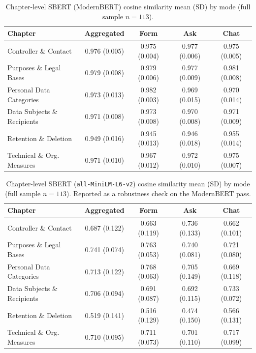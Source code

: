 \begin{table}[H]
\centering
\small
\setlength{\tabcolsep}{4pt}
\begin{tabular}{@{}l c c c c@{}}
\toprule
Chapter & Aggregated & Form & Ask & Chat \\
\midrule
Controller \& Contact         & 0.976 (0.005) & 0.975 (0.004) & 0.977 (0.006) & 0.975 (0.005) \\
Purposes \& Legal Bases       & 0.979 (0.008) & 0.979 (0.006) & 0.977 (0.009) & 0.981 (0.008) \\
Personal Data Categories      & 0.973 (0.013) & 0.982 (0.003) & 0.969 (0.015) & 0.970 (0.014) \\
Data Subjects \& Recipients   & 0.971 (0.008) & 0.973 (0.008) & 0.970 (0.008) & 0.971 (0.009) \\
Retention \& Deletion         & 0.949 (0.016) & 0.945 (0.013) & 0.946 (0.018) & 0.955 (0.014) \\
Technical \& Org. Measures    & 0.971 (0.010) & 0.967 (0.012) & 0.972 (0.010) & 0.975 (0.007) \\
\bottomrule
\end{tabular}
\caption{Chapter-level SBERT (ModernBERT) cosine similarity mean
(SD) by mode (full sample $n = 113$).}
\label{tab:nlp-chapter-sbert}
\end{table}

\begin{table}[H]
\centering
\small
\setlength{\tabcolsep}{4pt}
\begin{tabular}{@{}l c c c c@{}}
\toprule
Chapter & Aggregated & Form & Ask & Chat \\
\midrule
Controller \& Contact         & 0.687 (0.122) & 0.663 (0.119) & 0.736 (0.133) & 0.662 (0.101) \\
Purposes \& Legal Bases       & 0.741 (0.074) & 0.763 (0.053) & 0.740 (0.081) & 0.721 (0.080) \\
Personal Data Categories      & 0.713 (0.122) & 0.768 (0.063) & 0.705 (0.149) & 0.669 (0.118) \\
Data Subjects \& Recipients   & 0.706 (0.094) & 0.691 (0.087) & 0.692 (0.115) & 0.733 (0.072) \\
Retention \& Deletion         & 0.519 (0.141) & 0.516 (0.129) & 0.474 (0.150) & 0.566 (0.131) \\
Technical \& Org. Measures    & 0.710 (0.095) & 0.711 (0.073) & 0.701 (0.110) & 0.717 (0.099) \\
\bottomrule
\end{tabular}
\caption{Chapter-level SBERT (\texttt{all-MiniLM-L6-v2}) cosine
similarity mean (SD) by mode (full sample $n = 113$). Reported as
a robustness check on the ModernBERT pass.}
\label{tab:nlp-chapter-sbert-minilm}
\end{table}

